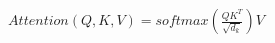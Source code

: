 \documentclass[preview]{standalone}
\begin{document}
\begin{align*}
Attention(Q, K, V) = softmax\left(\frac{QK^T}{\sqrt{d_k}}\right)V
\end{align*}
\end{document}
